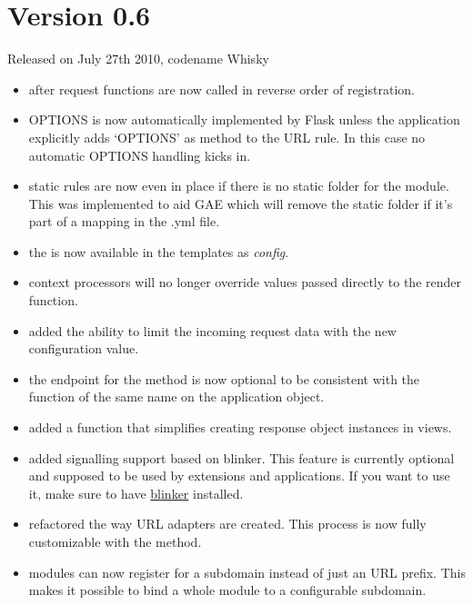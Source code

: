 \documentclass[a4paper,12pt]{sphinxmanual}
\begin{document}
\section{Version 0.6}
\label{changelog:version-0-6}
Released on July 27th 2010, codename Whisky
\begin{itemize}
\item {} 
after request functions are now called in reverse order of
registration.

\item {} 
OPTIONS is now automatically implemented by Flask unless the
application explicitly adds `OPTIONS' as method to the URL rule.
In this case no automatic OPTIONS handling kicks in.

\item {} 
static rules are now even in place if there is no static folder
for the module.  This was implemented to aid GAE which will
remove the static folder if it's part of a mapping in the .yml
file.

\item {} 
the {\hyperref[api:flask.Flask.config]{}} is now available in the templates
as \emph{config}.

\item {} 
context processors will no longer override values passed directly
to the render function.

\item {} 
added the ability to limit the incoming request data with the
new  configuration value.

\item {} 
the endpoint for the  method
is now optional to be consistent with the function of the
same name on the application object.

\item {} 
added a {\hyperref[api:flask.make_response]{}} function that simplifies
creating response object instances in views.

\item {} 
added signalling support based on blinker.  This feature is currently
optional and supposed to be used by extensions and applications.  If
you want to use it, make sure to have \href{http://pypi.python.org/pypi/blinker}{blinker} installed.

\item {} 
refactored the way URL adapters are created.  This process is now
fully customizable with the {\hyperref[api:flask.Flask.create_url_adapter]{}}
method.

\item {} 
modules can now register for a subdomain instead of just an URL
prefix.  This makes it possible to bind a whole module to a
configurable subdomain.

\end{itemize}
\end{document}
